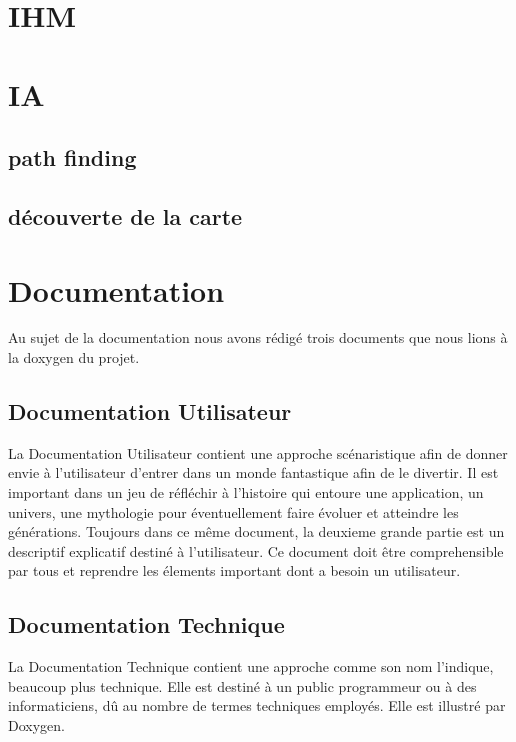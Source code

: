 \documentclass[a4paper 12pts]{article}
\begin{document}
\section{IHM}


\newpage
\section{IA}


\subsection{path finding}
\subsection{découverte de la carte}

\newpage

\section{Documentation}


Au sujet de la documentation nous avons rédigé trois documents que nous lions à la doxygen du projet.

\subsection{Documentation Utilisateur}

La Documentation Utilisateur contient une approche scénaristique afin de donner envie à l'utilisateur d'entrer dans un monde fantastique
afin de le divertir. Il est important dans un jeu de réfléchir à l'histoire qui entoure une application, un univers, une mythologie pour éventuellement
faire évoluer et atteindre les générations.
Toujours dans ce même document, la deuxieme grande partie est un descriptif explicatif destiné à l'utilisateur.
Ce document doit être comprehensible par tous et reprendre les élements important dont a besoin un utilisateur.

\subsection{Documentation Technique}

La Documentation Technique contient une approche comme son nom l'indique, beaucoup plus technique. Elle est destiné à un public programmeur
ou à des informaticiens, dû au nombre de termes techniques employés.
Elle est illustré par Doxygen.
\end{document}
